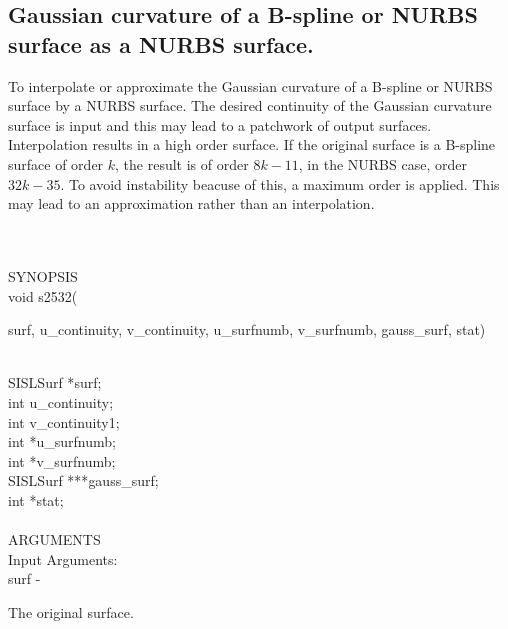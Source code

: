 \subsection{Gaussian curvature of a B-spline or NURBS 
            surface as a NURBS surface.}
\begin{minipg1}
To interpolate or approximate the Gaussian curvature of a B-spline or NURBS 
            surface by a NURBS surface. 
            The desired continuity of the Gaussian curvature surface is
            input and this may lead to a patchwork of output surfaces. 
            Interpolation results in a high order surface.
            If the original surface is a B-spline surface of order $k$,
            the result is of order $8k -11$, in the NURBS case,
            order $32k-35$.
            To avoid instability beacuse of this, a maximum order is
            applied. This may lead to an approximation rather than
            an interpolation.
\end{minipg1} \\ \\
SYNOPSIS\\
        \> void s2532(\begin{minipg3}
            {\fov surf}, {\fov u\_continuity}, {\fov v\_continuity}, {\fov u\_surfnumb}, 
	    {\fov v\_surfnumb}, {\fov gauss\_surf}, {\fov stat})
                \end{minipg3}\\
                \>\>    SISLSurf \> *{\fov surf};\\
                \>\>    int    \>  {\fov u\_continuity};\\
                \>\>    int    \>  {\fov v\_continuity}1;\\
                \>\>    int    \>  *{\fov u\_surfnumb};\\
                \>\>    int    \>  *{\fov v\_surfnumb};\\
                \>\>    SISLSurf \> ***{\fov gauss\_surf};\\
                \>\>    int    \>  *{\fov stat};\\
\\
ARGUMENTS\\
	\>Input Arguments:\\
        \>\>    {\fov surf}\> - \>  \begin{minipg2}
                     The original surface.
                               \end{minipg2}\\[0.8ex]
